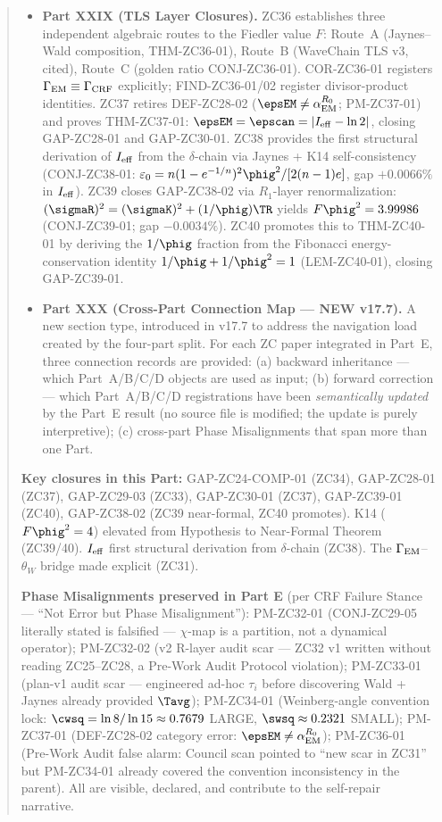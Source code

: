 \documentclass[12pt, a4paper]{article}
\begin{document}
\begin{abstract}
\begin{itemize}[leftmargin=2em]
\item \textbf{Part XXIX (TLS Layer Closures).}
ZC36 establishes three independent algebraic routes to the Fiedler
value $F$: Route~A (Jaynes--Wald composition, THM-ZC36-01), Route~B
(WaveChain TLS v3, cited), Route~C (golden ratio CONJ-ZC36-01).
COR-ZC36-01 registers $\Gamma_{\rm EM} \equiv \Gamma_{\rm CRF}$
explicitly; FIND-ZC36-01/02 register divisor-product identities.
ZC37 retires DEF-ZC28-02 ($\epsEM \neq \alpha_{\rm EM}^{R_0}$;
PM-ZC37-01) and proves THM-ZC37-01: $\epsEM = \epscan
= |I_{\rm eff} - \ln 2|$, closing GAP-ZC28-01 and GAP-ZC30-01.
ZC38 provides the first structural derivation of $I_{\rm eff}$ from
the $\delta$-chain via Jaynes + K14 self-consistency
(CONJ-ZC38-01: $\varepsilon_0 = n(1-e^{-1/n})^2\phig^2/[2(n-1)e]$,
gap $+0.0066\%$ in $I_{\rm eff}$). ZC39 closes GAP-ZC38-02 via
$R_1$-layer renormalization: $(\sigmaR)^2 = (\sigmaK)^2 +
(1/\phig)\TR$ yields $F\phig^2 = 3.99986$ (CONJ-ZC39-01; gap
$-0.0034\%$). ZC40 promotes this to THM-ZC40-01 by deriving the
$1/\phig$ fraction from the Fibonacci energy-conservation
identity $1/\phig + 1/\phig^2 = 1$ (LEM-ZC40-01), closing GAP-ZC39-01.

\item \textbf{Part XXX (Cross-Part Connection Map --- NEW v17.7).}
A new section type, introduced in v17.7 to address the navigation
load created by the four-part split. For each ZC paper integrated
in Part~E, three connection records are provided: (a) backward
inheritance --- which Part~A/B/C/D objects are used as input;
(b) forward correction --- which Part~A/B/C/D registrations have been
\emph{semantically updated} by the Part~E result (no source file is
modified; the update is purely interpretive); (c) cross-part Phase
Misalignments that span more than one Part.
\end{itemize}

\textbf{Key closures in this Part:}
GAP-ZC24-COMP-01 (ZC34), GAP-ZC28-01 (ZC37), GAP-ZC29-03 (ZC33),
GAP-ZC30-01 (ZC37), GAP-ZC39-01 (ZC40), GAP-ZC38-02 (ZC39 near-formal,
ZC40 promotes).
K14 ($F\phig^2 = 4$) elevated from Hypothesis to Near-Formal Theorem
(ZC39/40). $I_{\rm eff}$ first structural derivation from $\delta$-chain
(ZC38). The $\Gamma_{\rm EM}$--$\theta_W$ bridge made explicit (ZC31).

\textbf{Phase Misalignments preserved in Part E} (per CRF Failure
Stance --- ``Not Error but Phase Misalignment''):
PM-ZC32-01 (CONJ-ZC29-05 literally stated is falsified --- $\chi$-map
is a partition, not a dynamical operator);
PM-ZC32-02 (v2 R-layer audit scar --- ZC32 v1 written without reading
ZC25--ZC28, a Pre-Work Audit Protocol violation);
PM-ZC33-01 (plan-v1 audit scar --- engineered ad-hoc $\tau_i$ before
discovering Wald + Jaynes already provided $\Tavg$);
PM-ZC34-01 (Weinberg-angle convention lock: $\cwsq = \ln 8/\ln 15
\approx 0.7679$ LARGE, $\swsq \approx 0.2321$ SMALL);
PM-ZC37-01 (DEF-ZC28-02 category error: $\epsEM \neq
\alpha_{\rm EM}^{R_0}$);
PM-ZC36-01 (Pre-Work Audit false alarm: Council scan pointed to
``new scar in ZC31'' but PM-ZC34-01 already covered the convention
inconsistency in the parent).
All are visible, declared, and contribute to the self-repair narrative.


\end{abstract}
\end{document}
